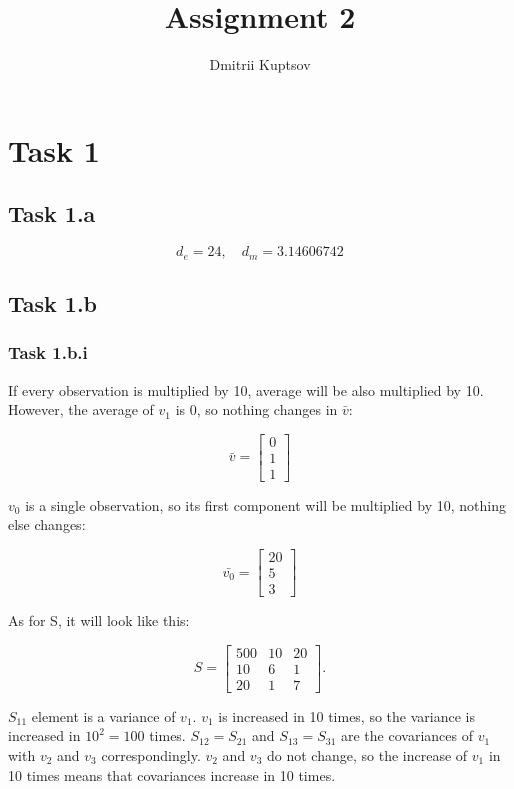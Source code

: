\documentclass[12pt]{article}
\title{Assignment 2}
\author{Dmitrii Kuptsov}
\begin{document}
\maketitle
\section*{Task 1}

\subsection*{Task 1.a}
\[
d_e = 24, \quad d_m = 3.14606742
\]

\subsection*{Task 1.b}

\subsubsection*{Task 1.b.i}

If every observation is multiplied by 10, average will be also multiplied by 10. However, the average of $v_1$ is 0, so nothing changes in $\bar{v}$:

\[
\bar{v} =
\begin{bmatrix}
0 \\[4pt]
1 \\[4pt]
1
\end{bmatrix}
\]


$v_0$ is a single observation, so its first component will be multiplied by 10, nothing else changes:


\[
\bar{v_0} =
\begin{bmatrix}
20 \\[4pt]
5 \\[4pt]
3
\end{bmatrix}
\]

As for S, it will look like this:

\[
S =
\begin{bmatrix}
500 & 10 & 20 \\[4pt]
10 & 6 & 1 \\[4pt]
20 & 1 & 7
\end{bmatrix}.
\]


$S_{11}$ element is a variance of $v_1$. $v_1$ is increased in 10 times, so the variance is increased in $10^2 = 100$ times. $S_{12} = S_{21}$ and  $S_{13} = S_{31}$ are the covariances of $v_1$ with $v_2$ and $v_3$ correspondingly. $v_2$ and $v_3$ do not change, so the increase of $v_1$ in 10 times means that covariances increase in 10 times.
\end{document}
